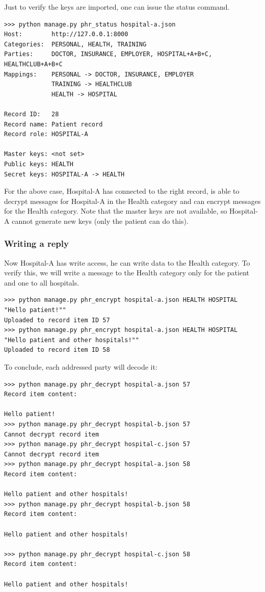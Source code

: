 \documentclass[a4paper]{article}
\begin{document}
			Just to verify the keys are imported, one can issue the status command.
			
			\begin{lstlisting}
>>> python manage.py phr_status hospital-a.json
Host:        http://127.0.0.1:8000
Categories:  PERSONAL, HEALTH, TRAINING
Parties:     DOCTOR, INSURANCE, EMPLOYER, HOSPITAL+A+B+C, HEALTHCLUB+A+B+C
Mappings:    PERSONAL -> DOCTOR, INSURANCE, EMPLOYER
             TRAINING -> HEALTHCLUB
             HEALTH -> HOSPITAL

Record ID:   28
Record name: Patient record
Record role: HOSPITAL-A

Master keys: <not set>
Public keys: HEALTH
Secret keys: HOSPITAL-A -> HEALTH
			\end{lstlisting}
			
			For the above case, Hospital-A has connected to the right record, is able to decrypt messages for Hospital-A in the Health category and can encrypt messages for the Health category. Note that the master keys are not available, so Hospital-A cannot generate new keys (only the patient can do this).
		
		\subsubsection{Writing a reply}\label{sec:usecase_7}
			Now Hospital-A has write access, he can write data to the Health category. To verify this, we will write a message to the Health category only for the patient and one to all hospitals.
			
			\begin{lstlisting}
>>> python manage.py phr_encrypt hospital-a.json HEALTH HOSPITAL "Hello patient!""
Uploaded to record item ID 57
>>> python manage.py phr_encrypt hospital-a.json HEALTH HOSPITAL "Hello patient and other hospitals!""
Uploaded to record item ID 58
			\end{lstlisting}
			
			To conclude, each addressed party will decode it:

			\begin{lstlisting}
>>> python manage.py phr_decrypt hospital-a.json 57
Record item content:

Hello patient!
>>> python manage.py phr_decrypt hospital-b.json 57
Cannot decrypt record item
>>> python manage.py phr_decrypt hospital-c.json 57
Cannot decrypt record item
>>> python manage.py phr_decrypt hospital-a.json 58
Record item content:

Hello patient and other hospitals!
>>> python manage.py phr_decrypt hospital-b.json 58
Record item content:

Hello patient and other hospitals!

>>> python manage.py phr_decrypt hospital-c.json 58
Record item content:

Hello patient and other hospitals!
			\end{lstlisting}
\end{document}
